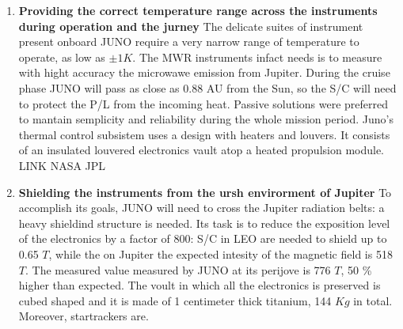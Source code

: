 \begin{enumerate}[leftmargin=1.5em]
    \item \textbf{Providing the correct temperature range across the instruments during operation and the jurney}
    \newline The delicate suites of instrument present onboard JUNO require a very narrow range of temperature to operate, as 
    low as $\pm 1 K$. The MWR instruments infact needs is to measure with hight accuracy the microwawe emission from Jupiter. During the cruise phase JUNO will pass as close as 0.88 AU from the Sun, so the S/C will need to protect the P/L from the incoming heat. Passive solutions were preferred to mantain semplicity and reliability during the whole mission period. Juno's thermal control subsistem uses a design with heaters and louvers. It consists of an insulated louvered electronics vault atop a heated propulsion module. 
    LINK NASA JPL 
    \item \textbf{Shielding the instruments from the ursh envirorment of Jupiter}
    \newline To accomplish its goals, JUNO will need to cross the Jupiter radiation belts: a heavy shieldind structure is needed. Its task is to reduce the exposition level of the electronics by a factor of 800: S/C in LEO are needed to shield up to 0.65 $T$, while the on Jupiter the expected intesity of the magnetic field is 518 $T$. The measured value measured by JUNO at its perijove is 776 $T$, 50 \% higher than expected. The voult in which all the electronics is preserved is cubed shaped and it is made of 1 centimeter thick titanium, 144 $Kg$ in total. Moreover, startrackers are.
\end{enumerate}  